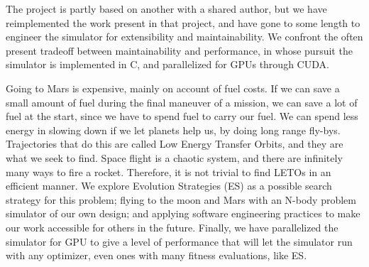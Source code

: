 The project is partly based on another with a shared author, but we have reimplemented the work present in that project, and have gone to some length to engineer the simulator for extensibility and maintainability. We confront the often present tradeoff between maintainability and performance, in whose pursuit the simulator is implemented in C, and parallelized for GPUs through CUDA. 

Going to Mars is expensive, mainly on account of fuel costs. If we can save a small amount of fuel during the final maneuver of a mission, we can save a lot of fuel at the start, since we have to spend fuel to carry our fuel. We can spend less energy in slowing down if we let planets help us, by doing long range fly-bys. Trajectories that do this are called Low Energy Transfer Orbits, and they are what we seek to find. Space flight is a chaotic system, and there are infinitely many ways to fire a rocket. Therefore, it is not trivial to find LETOs in an efficient manner. We explore Evolution Strategies (ES) as a possible search strategy for this problem; flying to the moon and Mars with an N-body problem simulator of our own design; and applying software engineering practices to make our work accessible for others in the future. Finally, we have parallelized the simulator for GPU to give a level of performance that will let the simulator run with any optimizer, even ones with many fitness evaluations, like ES.